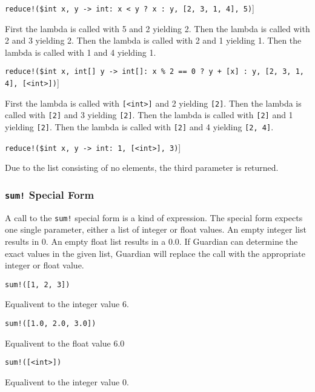 {{\begin{itemize}
{			\item \texttt{reduce!(\$int x, y -> int: x < y ? x : y, [2, 3, 1, 4], 5)}]
			
				First the lambda is called with 5 and 2 yielding 2.
				Then the lambda is called with 2 and 3 yielding 2.
				Then the lambda is called with 2 and 1 yielding 1.
				Then the lambda is called with 1 and 4 yielding 1.
				
			\item \texttt{reduce!(\$int x, int[] y -> int[]: x \% 2 == 0 ? y + [x] : y, [2, 3, 1, 4], [<int>])}]
			
				First the lambda is called with \texttt{[<int>]} and 2 yielding \texttt{[2]}.
				Then the lambda is called with \texttt{[2]} and 3 yielding \texttt{[2]}.
				Then the lambda is called with \texttt{[2]} and 1 yielding \texttt{[2]}.
				Then the lambda is called with \texttt{[2]} and 4 yielding \texttt{[2, 4]}.
				
			\item \texttt{reduce!(\$int x, y -> int: 1, [<int>], 3)}]
			
				Due to the list consisting of no elements, the third parameter
				is returned.
		}
		\end{itemize}
	}
	
	\subsubsection{\texttt{sum!} Special Form}
	{
		A call to the \texttt{sum!} special form is a kind of expression.
		The special form expects one single parameter, either a list of integer
		or float values. An empty integer list results in 0. An empty float list
		results in a 0.0.
		If Guardian can determine the exact values in the given list, Guardian
		will replace the call with the appropriate integer or float value.
		
		\begin{itemize}
		{
			\item \texttt{sum!([1, 2, 3])}
			
				Equalivent to the integer value 6.
			
			\item \texttt{sum!([1.0, 2.0, 3.0])}
			
				Equalivent to the float value 6.0
			
			\item \texttt{sum!([<int>])}
			
				Equalivent to the integer value 0.
		}
		\end{itemize}
	}
}






















